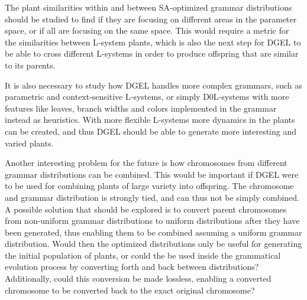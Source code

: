 The plant similarities within and between SA-optimized grammar distributions should be studied to find if they are focusing on different areas in the parameter space, or if all are focusing on the same space.
This would require a metric for the similarities between L-system plants, which is also the next step for DGEL to be able to cross different L-systems in order to produce offspring that are similar to its parents.

It is also necessary to study how DGEL handles more complex grammars, such as parametric and context-sensitive L-systems, or simply D0L-systems with more features like leaves, branch widths and colors implemented in the grammar instead as heuristics.
With more flexible L-systems more dynamics in the plants can be created, and thus DGEL should be able to generate more interesting and varied plants.

Another interesting problem for the future is how chromosomes from different grammar distributions can be combined.
This would be important if DGEL were to be used for combining plants of large variety into offspring.
The chromosome and grammar distribution is strongly tied, and can thus not be simply combined.
A possible solution that should be explored is to convert parent chromosomes from non-uniform grammar distributions to uniform distributions after they have been generated, thus enabling them to be combined assuming a uniform grammar distribution.
Would then the optimized distributions only be useful for generating the initial population of plants, or could the be used inside the grammatical evolution process by converting forth and back between distributions?
Additionally, could this conversion be made lossless, enabling a converted chromosome to be converted back to the exact original chromosome?
